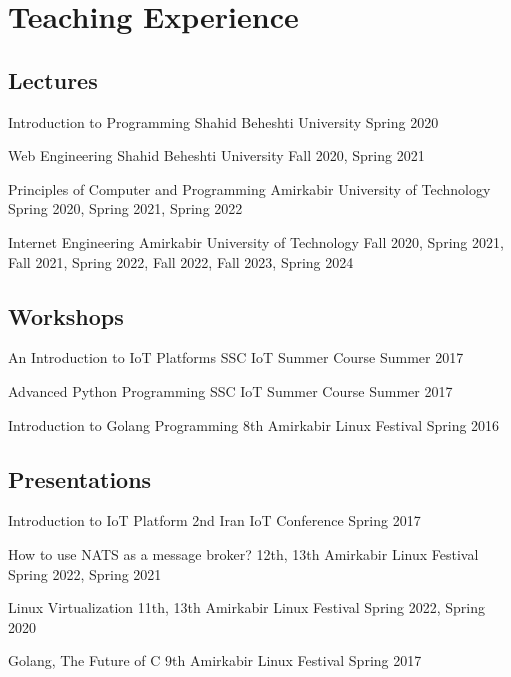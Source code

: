 \section{Teaching Experience}

\subsection{Lectures}
\cventry{}
{Introduction to Programming}
{}
{Shahid Beheshti University}
{}
{Spring 2020}

\cventry{}
{Web Engineering}
{}
{Shahid Beheshti University}
{}
{Fall 2020, Spring 2021}

\cventry{}
{Principles of Computer and Programming}
{}
{Amirkabir University of Technology}
{}
{Spring 2020, Spring 2021, Spring 2022}

\cventry{}
{Internet Engineering}
{}
{Amirkabir University of Technology}
{}
{Fall 2020, Spring 2021, Fall 2021, Spring 2022, Fall 2022, Fall 2023, Spring 2024}

\subsection{Workshops}

\cventry{}
{An Introduction to IoT Platforms}
{}
{SSC IoT Summer Course}
{}
{Summer 2017}

\cventry{}
{Advanced Python Programming}
{}
{SSC IoT Summer Course}
{}
{Summer 2017}

\cventry{}
{Introduction to Golang Programming}
{}
{8th Amirkabir Linux Festival}
{}
{Spring 2016}

\subsection{Presentations}

\cventry{}
{Introduction to IoT Platform}
{}
{2nd Iran IoT Conference}
{}
{Spring 2017}

\cventry{}
{How to use NATS as a message broker?}
{}
{12th, 13th Amirkabir Linux Festival}
{}
{Spring 2022, Spring 2021}

\cventry{}
{Linux Virtualization}
{}
{11th, 13th Amirkabir Linux Festival}
{}
{Spring 2022, Spring 2020}

\cventry{}
{Golang, The Future of C}
{}
{9th Amirkabir Linux Festival}
{}
{Spring 2017}
